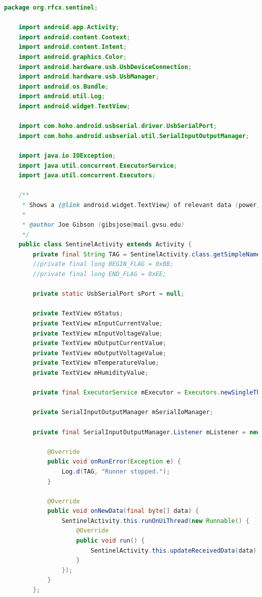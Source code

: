 \documentclass{article}
\numberwithin{figure}{section}
\numberwithin{equation}{section}
\begin{document}
{\begin{lstlisting}[language=Java,label=lst:sentlist,caption=SentinelActivity.java]
    package org.rfcx.sentinel;

    import android.app.Activity;
    import android.content.Context;
    import android.content.Intent;
    import android.graphics.Color;
    import android.hardware.usb.UsbDeviceConnection;
    import android.hardware.usb.UsbManager;
    import android.os.Bundle;
    import android.util.Log;
    import android.widget.TextView;

    import com.hoho.android.usbserial.driver.UsbSerialPort;
    import com.hoho.android.usbserial.util.SerialInputOutputManager;

    import java.io.IOException;
    import java.util.concurrent.ExecutorService;
    import java.util.concurrent.Executors;

    /**
     * Shows a {@link android.widget.TextView} of relevant data (power, temperature, humidity)
     *
     * @author Joe Gibson (gibsjose@mail.gvsu.edu)
     */
    public class SentinelActivity extends Activity {
        private final String TAG = SentinelActivity.class.getSimpleName();
        //private final long BEGIN_FLAG = 0xBB;
        //private final long END_FLAG = 0xEE;

        private static UsbSerialPort sPort = null;

        private TextView mStatus;
        private TextView mInputCurrentValue;
        private TextView mInputVoltageValue;
        private TextView mOutputCurrentValue;
        private TextView mOutputVoltageValue;
        private TextView mTemperatureValue;
        private TextView mHumidityValue;

        private final ExecutorService mExecutor = Executors.newSingleThreadExecutor();

        private SerialInputOutputManager mSerialIoManager;

        private final SerialInputOutputManager.Listener mListener = new SerialInputOutputManager.Listener() {

            @Override
            public void onRunError(Exception e) {
                Log.d(TAG, "Runner stopped.");
            }

            @Override
            public void onNewData(final byte[] data) {
                SentinelActivity.this.runOnUiThread(new Runnable() {
                    @Override
                    public void run() {
                        SentinelActivity.this.updateReceivedData(data);
                    }
                });
            }
        };


\end{lstlisting}}
\end{document}
